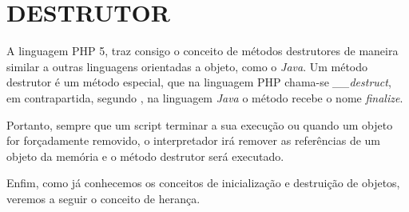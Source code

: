 \section{DESTRUTOR}

A linguagem PHP 5, traz consigo o conceito de métodos destrutores de maneira 
similar a outras linguagens orientadas a objeto, como o \textit{Java}. Um método 
destrutor é um método especial, que na linguagem PHP chama-se
\textit{\_\_destruct}, em contrapartida, segundo , na
linguagem \textit{Java} o método recebe o nome \textit{finalize}.

Portanto, sempre que um script terminar a sua execução ou quando um objeto for
forçadamente removido, o interpretador irá remover as referências de um objeto 
da memória e o método destrutor será executado.

Enfim, como já conhecemos os conceitos de inicialização e destruição de objetos,
veremos a seguir o conceito de herança.
